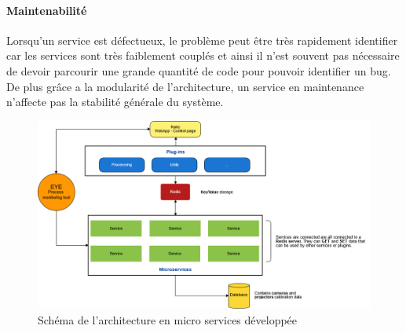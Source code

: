 \paragraph{Maintenabilité} Lorsqu'un service est défectueux, le problème peut être très rapidement identifier car les services sont très faiblement couplés et ainsi il n'est souvent pas nécessaire de devoir parcourir une grande quantité de code pour pouvoir identifier un bug. De plus grâce a la modularité de l'architecture, un service en maintenance n'affecte pas la stabilité générale du système.


\begin{figure}[H]
\centering
\includegraphics[width=\linewidth]{images/archi3}
\caption{Schéma de l'architecture en micro services développée}
\label{fig:microarchi}
\end{figure} 

